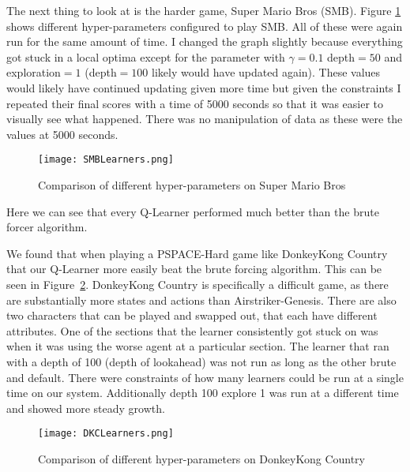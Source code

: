 \FloatBarrier
The next thing to look at is the harder game, Super Mario Bros (SMB). Figure
\ref{fig:SMBLearn} shows different hyper-parameters configured to play
SMB. All of these were again run for the same amount of time. I changed the 
graph slightly because everything got stuck in a local optima except for the 
parameter with $\gamma=0.1$ depth$=50$ and exploration$=1$ (depth$=100$ likely
would have updated again). These values would likely have continued updating 
given more time but given the constraints I repeated their final scores with 
a time of 5000 seconds so that it was easier to visually see what happened.
There was no manipulation of data as these were the values at 5000 seconds. 
\begin{figure}[ht]
    \centering
    \texttt{[image: SMBLearners.png]}
    \caption{Comparison of different hyper-parameters on Super Mario Bros}
    \label{fig:SMBLearn}
\end{figure}
Here we can see that every Q-Learner performed much better than the brute forcer
algorithm. 

\FloatBarrier
We found that when playing a PSPACE-Hard game like DonkeyKong Country
that our Q-Learner more easily beat the brute forcing algorithm. This can
be seen in Figure~\ref{fig:DKCLearn}. DonkeyKong Country is specifically
a difficult game, as there are substantially more states and actions than 
Airstriker-Genesis. There are also two characters that can be played and 
swapped out, that each have different attributes. One of the sections that the
learner consistently got stuck on was when it was using the worse agent at
a particular section.
The learner that ran with a depth of 100 (depth of lookahead) was not run as 
long as the other brute and default. There were constraints of how many 
learners could be run at a single time on our system. Additionally
depth 100 explore 1 was run at a different time and showed more steady growth.
\begin{figure}[ht]
    \centering
    \texttt{[image: DKCLearners.png]}
    \caption{Comparison of different hyper-parameters on DonkeyKong Country}
    \label{fig:DKCLearn}
\end{figure}

